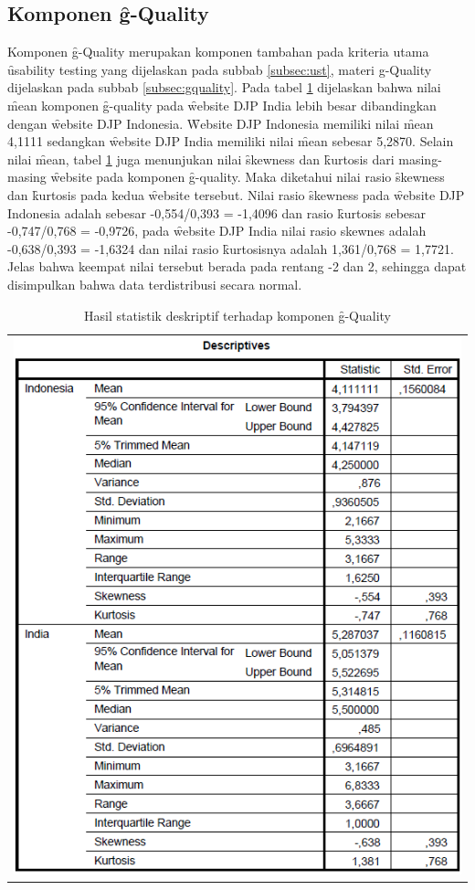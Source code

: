 \subsection{Komponen \f{g-Quality}}
Komponen \f{g-Quality} merupakan komponen tambahan pada kriteria utama \f{usability testing} yang dijelaskan pada subbab \ref{subsec:ust}, materi g-Quality dijelaskan pada subbab \ref{subsec:gquality}. Pada tabel \ref{tab:descgq} dijelaskan bahwa nilai \f{mean} komponen \f{g-quality} pada \f{website} DJP India lebih besar dibandingkan dengan \f{website} DJP Indonesia. \f{Website} DJP Indonesia memiliki nilai \f{mean} 4,1111 sedangkan \f{website} DJP India memiliki nilai \f{mean} sebesar 5,2870. Selain nilai \f{mean}, tabel \ref{tab:descgq} juga menunjukan nilai \f{skewness} dan \f{kurtosis} dari masing-masing \f{website} pada komponen \f{g-quality}. Maka diketahui nilai rasio \f{skewness} dan \f{kurtosis} pada kedua \f{website} tersebut. Nilai rasio \f{skewness} pada \f{website} DJP Indonesia adalah sebesar -0,554/0,393 = -1,4096 dan rasio \f{kurtosis} sebesar -0,747/0,768 = -0,9726, pada \f{website} DJP India nilai rasio skewnes adalah -0,638/0,393 = -1,6324 dan nilai rasio \f{kurtosis}nya adalah 1,361/0,768 = 1,7721. Jelas bahwa keempat nilai tersebut berada pada rentang -2 dan 2, sehingga dapat disimpulkan bahwa data terdistribusi secara normal. 
\begin{table}
	\centering
	\caption{Hasil statistik deskriptif terhadap komponen \f{g-Quality}}
	\label{tab:descgq}
	\begin{tabular}{c}
		\includegraphics[width=\textwidth]
		{pics/ordinaldescGQ.PNG}
	\end{tabular}
\end{table}
